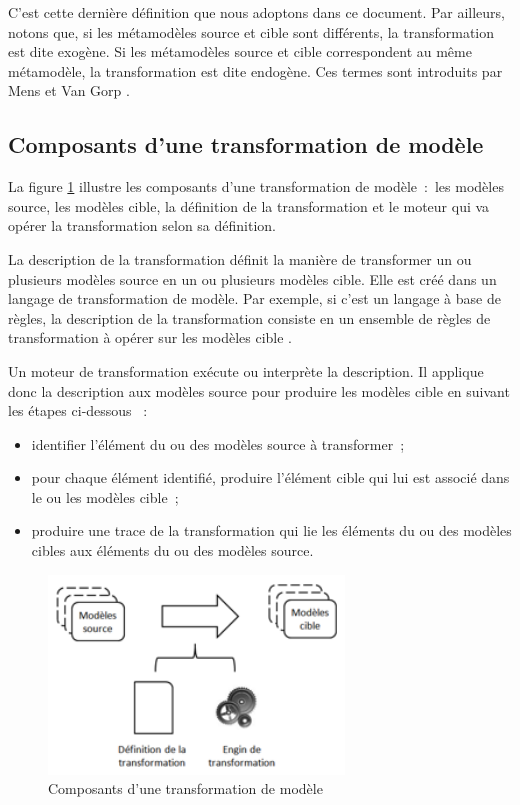 C'est cette dernière définition que nous adoptons dans ce document. Par 
ailleurs, notons que, si les métamodèles source et cible sont différents, la 
transformation est dite exogène. Si les métamodèles source et cible 
correspondent au même métamodèle, la transformation est dite endogène. Ces 
termes sont introduits par Mens et Van Gorp \cite{mens2006taxonomy}.

\subsection{Composants d'une transformation de modèle} 
La figure \ref{fig:composantTransfo} illustre les composants d'une 
transformation de modèle~:~les modèles source, les modèles cible, la définition 
de la transformation et le moteur qui va opérer la transformation selon sa 
définition. 

La description de la transformation définit la manière de transformer un ou plusieurs modèles source en un ou plusieurs modèles cible. Elle est créé dans 
un langage de transformation de modèle. Par exemple, si c'est un langage à base 
de règles, la description de la transformation consiste en un ensemble de règles 
de transformation à opérer sur les modèles cible \cite{kleppe2003mda}. 

Un moteur de transformation exécute ou interprète la description. Il applique 
donc la description aux modèles source pour produire les modèles cible en 
suivant les étapes ci-dessous \cite{tratt2005model}~:

\begin{itemize}
\item identifier l'élément du ou des modèles source à transformer~;
\item pour chaque élément identifié, produire l'élément cible qui lui est 
associé dans le ou les modèles cible~;
\item produire une trace de la transformation qui lie les éléments du ou des 
modèles cibles aux éléments du ou des modèles source.
\end{itemize}

\begin{figure}[!htbp]
 \begin{center}
   \includegraphics[width=0.7\textwidth]{figures/3_etat_de_l_art_IDM/composanttransfo.png}
 \end{center}
 \caption{Composants d'une transformation de modèle}
 \label{fig:composantTransfo}
\end{figure}

